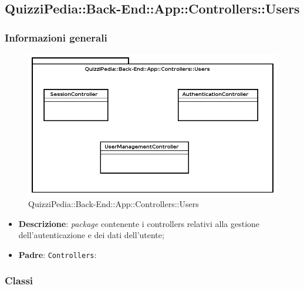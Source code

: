 \subsection{QuizziPedia::Back-End::App::Controllers::Users}
\subsubsection{Informazioni generali}
\label{QuizziPedia::Back-End::App::Controllers::Users}
\begin{figure}[ht]
	\centering
	\includegraphics[scale=0.]{UML/Package/QuizziPedia_Back-End_App_Controllers_Users.png}
	\caption{QuizziPedia::Back-End::App::Controllers::Users}
\end{figure}
\FloatBarrier
\begin{itemize}
	\item 
	\textbf{Descrizione}:
	\textit{package} contenente i controllers relativi alla gestione dell'autenticazione e dei dati dell'utente;
	\item
	\textbf{Padre}:
	\texttt{Controllers}:
\end{itemize}	
\subsubsection{Classi}
